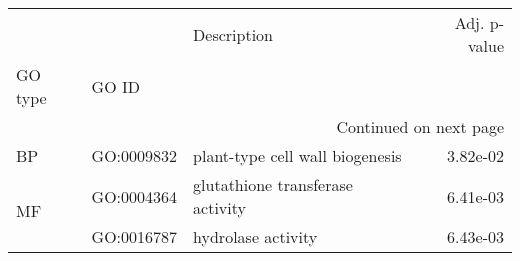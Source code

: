 \begin{longtable}{lllr}
\toprule
   &            &                       Description &  Adj. p-value \\
GO type & GO ID &                                   &               \\
\midrule
\endhead
\midrule
\multicolumn{4}{r}{{Continued on next page}} \\
\midrule
\endfoot

\bottomrule
\endlastfoot
BP & GO:0009832 &   plant-type cell wall biogenesis &      3.82e-02 \\
\multirow{2}{*}{MF} & GO:0004364 &  glutathione transferase activity &      6.41e-03 \\
   & GO:0016787 &                hydrolase activity &      6.43e-03 \\
\end{longtable}